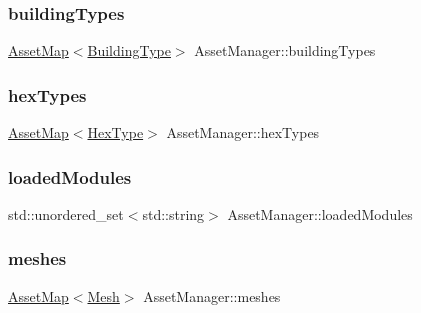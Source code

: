 \subsubsection{\texorpdfstring{building\+Types}{buildingTypes}}
{\footnotesize\ttfamily \hyperlink{class_asset_manager_a67ef2a74c058b6cebefd838bcc3a7d96}{Asset\+Map}$<$\hyperlink{class_building_type}{Building\+Type}$>$ Asset\+Manager\+::building\+Types\hspace{0.3cm}{\ttfamily [private]}}

\mbox{\label{class_asset_manager_ae18b67cef82301126542d8bf823823e6}} 
\subsubsection{\texorpdfstring{hex\+Types}{hexTypes}}
{\footnotesize\ttfamily \hyperlink{class_asset_manager_a67ef2a74c058b6cebefd838bcc3a7d96}{Asset\+Map}$<$\hyperlink{class_hex_type}{Hex\+Type}$>$ Asset\+Manager\+::hex\+Types\hspace{0.3cm}{\ttfamily [private]}}

\mbox{\label{class_asset_manager_ad6b33a87ecdeaa2e5c405edfdc0b639e}} 
\subsubsection{\texorpdfstring{loaded\+Modules}{loadedModules}}
{\footnotesize\ttfamily std\+::unordered\+\_\+set$<$std\+::string$>$ Asset\+Manager\+::loaded\+Modules\hspace{0.3cm}{\ttfamily [private]}}

\mbox{\label{class_asset_manager_a4bfad66bc0842a2299d376e2f651b31a}} 
\subsubsection{\texorpdfstring{meshes}{meshes}}
{\footnotesize\ttfamily \hyperlink{class_asset_manager_a67ef2a74c058b6cebefd838bcc3a7d96}{Asset\+Map}$<$\hyperlink{class_mesh}{Mesh}$>$ Asset\+Manager\+::meshes\hspace{0.3cm}{\ttfamily [private]}}

